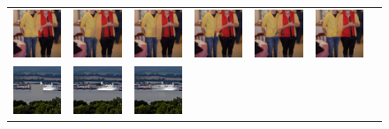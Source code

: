 \begin{figure}[!ht]
\begin{tabular}{ccccccc}
\includegraphics[width=.14\textwidth]{figures/imagenet/imagenet_0034_pm.jpg}&
\includegraphics[width=.14\textwidth]{figures/imagenet/0034_ce2.jpg}&
\includegraphics[width=.14\textwidth]{figures/imagenet/0034_nps2.jpg}&
\includegraphics[width=.14\textwidth]{figures/imagenet/imagenet_0034_siggraph2017.jpg}&
\includegraphics[width=.14\textwidth]{figures/imagenet/imagenet_0034_g.jpg}&
\includegraphics[width=.14\textwidth]{figures/imagenet/imagenet_0034_synthesized_image.jpg}\\
\includegraphics[width=.14\textwidth]{figures/imagenet/imagenet_0165_input_image.jpg}&
\includegraphics[width=.14\textwidth]{figures/imagenet/imagenet_0165_pm.jpg}&
\includegraphics[width=.14\textwidth]{figures/imagenet/0165_ce2.jpg}&

\end{tabular}
\end{figure}
